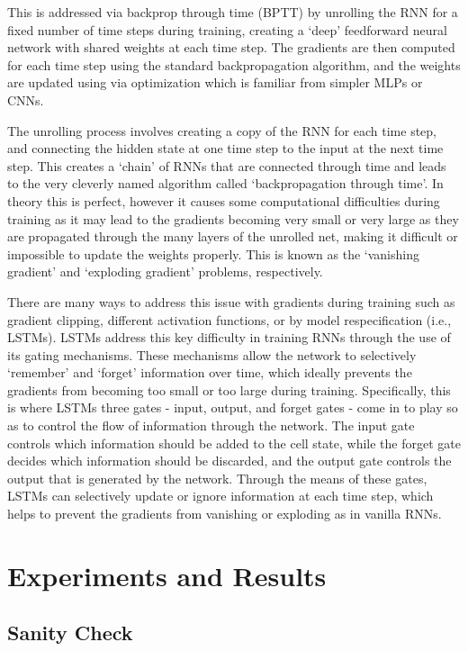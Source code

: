 \documentclass[12pt, twoside]{report}
\begin{document}
This is addressed via backprop through time (BPTT) by unrolling the RNN for a fixed number of time steps during training, 
creating a `deep' feedforward neural network with shared weights at each time step.
The gradients are then computed for each time step using the standard backpropagation algorithm, 
and the weights are updated using via optimization which is familiar from simpler MLPs or CNNs.

The unrolling process involves creating a copy of the RNN for each time step, and connecting the hidden state at 
one time step to the input at the next time step.
This creates a `chain' of RNNs that are connected through time and leads to the very cleverly named algorithm 
called `backpropagation through time'.
In theory this is perfect, however it causes some computational difficulties during training as it may lead to
the gradients becoming very small or very large as they are propagated through the many layers of the unrolled net,
making it difficult or impossible to update the weights properly.
This is known as the `vanishing gradient' and `exploding gradient' problems, respectively.

There are many ways to address this issue with gradients during training such as gradient clipping, different
activation functions, or by model respecification (i.e., LSTMs).
LSTMs address this key difficulty in training RNNs through the use of its gating mechanisms.
These mechanisms allow the network to selectively `remember' and `forget' information over time, 
which ideally prevents the gradients from becoming too small or too large during training.
Specifically, this is where LSTMs three gates - input, output, and forget gates - come in to play so as to 
control the flow of information through the network.
The input gate controls which information should be added to the cell state, while the forget gate decides 
which information should be discarded, and the output gate controls the output that is generated by the network.
Through the means of these gates, LSTMs can selectively update or ignore information at each time step,
which helps to prevent the gradients from vanishing or exploding as in vanilla RNNs.

\chapter{Experiments and Results}

\section{Sanity Check}
\end{document}
